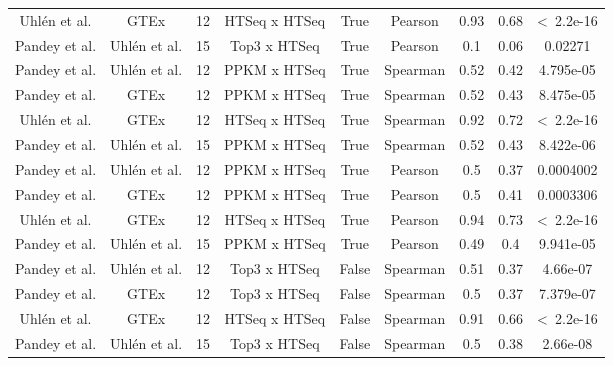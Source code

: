 \begin{landscape}
\begin{longtable}{@{}ccccccccc@{}}
{\color[HTML]{9B9B9B} Uhlén et al.} & {\color[HTML]{9B9B9B} GTEx} & {\color[HTML]{9B9B9B} 12} & {\color[HTML]{9B9B9B} HTSeq x HTSeq} & {\color[HTML]{9B9B9B} True} & {\color[HTML]{9B9B9B} Pearson} & {\color[HTML]{9B9B9B} 0.93} & {\color[HTML]{9B9B9B} 0.68} & {\color[HTML]{9B9B9B} \textless\ 2.2e-16} \\
Pandey et al. & Uhlén et al. & 15 & Top3 x HTSeq & True & Pearson & 0.1 & 0.06 & 0.02271 \\
Pandey et al. & Uhlén et al. & 12 & PPKM x HTSeq & True & Spearman & 0.52 & 0.42 & 4.795e-05 \\
Pandey et al. & GTEx & 12 & PPKM x HTSeq & True & Spearman & 0.52 & 0.43 & 8.475e-05 \\
{\color[HTML]{9B9B9B} Uhlén et al.} & {\color[HTML]{9B9B9B} GTEx} & {\color[HTML]{9B9B9B} 12} & {\color[HTML]{9B9B9B} HTSeq x HTSeq} & {\color[HTML]{9B9B9B} True} & {\color[HTML]{9B9B9B} Spearman} & {\color[HTML]{9B9B9B} 0.92} & {\color[HTML]{9B9B9B} 0.72} & {\color[HTML]{9B9B9B} \textless\ 2.2e-16} \\
Pandey et al. & Uhlén et al. & 15 & PPKM x HTSeq & True & Spearman & 0.52 & 0.43 & 8.422e-06 \\
Pandey et al. & Uhlén et al. & 12 & PPKM x HTSeq & True & Pearson & 0.5 & 0.37 & 0.0004002 \\
Pandey et al. & GTEx & 12 & PPKM x HTSeq & True & Pearson & 0.5 & 0.41 & 0.0003306 \\
{\color[HTML]{9B9B9B} Uhlén et al.} & {\color[HTML]{9B9B9B} GTEx} & {\color[HTML]{9B9B9B} 12} & {\color[HTML]{9B9B9B} HTSeq x HTSeq} & {\color[HTML]{9B9B9B} True} & {\color[HTML]{9B9B9B} Pearson} & {\color[HTML]{9B9B9B} 0.94} & {\color[HTML]{9B9B9B} 0.73} & {\color[HTML]{9B9B9B} \textless\ 2.2e-16} \\
Pandey et al. & Uhlén et al. & 15 & PPKM x HTSeq & True & Pearson & 0.49 & 0.4 & 9.941e-05 \\* \midrule
Pandey et al. & Uhlén et al. & 12 & Top3 x HTSeq & False & Spearman & 0.51 & 0.37 & 4.66e-07 \\
Pandey et al. & GTEx & 12 & Top3 x HTSeq & False & Spearman & 0.5 & 0.37 & 7.379e-07 \\
{\color[HTML]{9B9B9B} Uhlén et al.} & {\color[HTML]{9B9B9B} GTEx} & {\color[HTML]{9B9B9B} 12} & {\color[HTML]{9B9B9B} HTSeq x HTSeq} & {\color[HTML]{9B9B9B} False} & {\color[HTML]{9B9B9B} Spearman} & {\color[HTML]{9B9B9B} 0.91} & {\color[HTML]{9B9B9B} 0.66} & {\color[HTML]{9B9B9B} \textless\ 2.2e-16} \\
Pandey et al. & Uhlén et al. & 15 & Top3 x HTSeq & False & Spearman & 0.5 & 0.38 & 2.66e-08 \\

\end{longtable}
\end{landscape}
